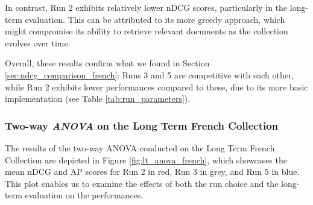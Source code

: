 In contrast, Run 2 exhibits relatively lower \ac{nDCG} scores, particularly in the long-term evaluation. This can be attributed to its more greedy approach, which might compromise its ability to retrieve relevant documents as the collection evolves over time.

Overall, these results confirm what we found in Section \ref{sec:ndcg_comparison_french}: Runs 3 and 5 are competitive with each other, while Run 2 exhibits lower performances compared to these, due to its more basic implementation (see Table \ref{tab:run_parameters}). 


\subsubsection{Two-way \textit{ANOVA} on the Long Term French Collection} \label{sec:anova_fr_lt}

The results of the two-way \ac{ANOVA} conducted on the Long Term French Collection are depicted in Figure \ref{fig:lt_anova_french}, which showcases the mean \ac{nDCG} and \ac{AP} scores for Run 2 in red, Run 3 in grey, and Run 5 in blue. 
This plot enables us to examine the effects of both the run choice and the long-term evaluation on the performances.

